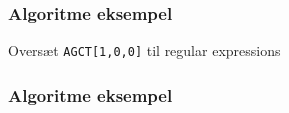 \documentclass{beamer}
\begin{document}
\begin{frame}
	\frametitle{Algoritme eksempel}
	Oversæt \texttt{AGCT[1,0,0]} til regular expressions
\end{frame}

\begin{frame}
	\frametitle{Algoritme eksempel}
	
\end{frame}
\end{document}
